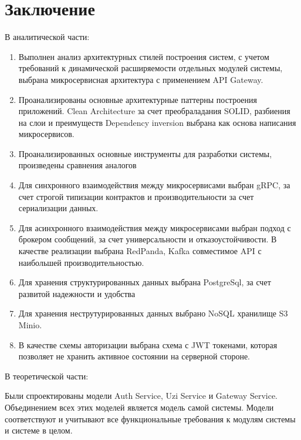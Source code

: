 \chapter*{Заключение}

В аналитической части: 



\begin{enumerate}
	\item Выполнен анализ архитектурных стилей построения систем, с учетом требований к динамической расширяемости отдельных модулей системы, выбрана микросервисная архитектура с применением API Gateway.
	\item Проанализированы основные архитектурные паттерны построения приложений. Clean Architecture за счет преобраладания SOLID, разбиения на слои и преимуществ Dependency inversion выбрана как основа написания микросервисов.
	\item Проанализированных основные инструменты для разработки системы, произведены сравнения аналогов\\
        \item Для синхронного взаимодействия между микросервисами выбран gRPC, за счет строгой типизации контрактов и производительности за счет сериализации данных.\\
        \item Для асинхронного взаимодействия между микросервисами выбран подход с брокером сообщений, за счет универсальности и отказоустойчивости. В качестве реализации выбрана RedPanda, Kafka совместимое API с наибольшей производительностью.\\
        \item Для хранения структурированных данных выбрана PostgreSql, за счет развитой надежности и удобства\\
        \item Для хранения неструтурированных данных выбрано NoSQL хранилище S3 Minio.\\
        \item В качестве схемы авторизации выбрана схема с JWT токенами, которая позволяет не хранить активное состоянии на серверной стороне.\\
\end{enumerate}


В теоретической части:


Были спроектированы модели Auth Service, Uzi Service и Gateway Service. Объединением всех этих моделей является
модель самой системы. Модели соответствуют и учитывают все функциональные требования к модулям системы и системе в целом.


